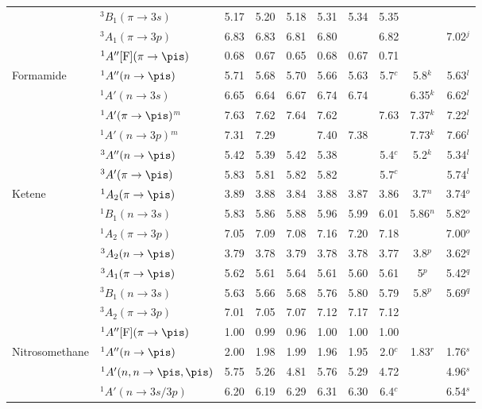 \begin{tabular}{ll|ccc|ccc|cc}
        &$^3B_1 (\pi \rightarrow 3s)$ 			&5.17&5.20&5.18&	5.31&5.34&5.35	&		   &			\\
        &$^3A_1 (\pi \rightarrow 3p)$			&6.83&6.83&6.81&	6.80&       &6.82	&		   &7.02$^j$	\\
        &$^1A'' [\mathrm{F}]	(\pi \rightarrow \pis)$	&0.68&0.67&0.65&	0.68&0.67&0.71	&	 	   &			\\
    Formamide	&$^1A'' (n \rightarrow \pis)$			&5.71&5.68&5.70	&5.66&5.63&5.7$^c$&5.8$^k$		&5.63$^l$	\\
        &$^1A' (n \rightarrow 3s)$				&6.65&6.64&6.67	&6.74&6.74&		&6.35$^k$	&6.62$^l$	\\	
        &$^1A' (\pi \rightarrow \pis)$$^m$		&7.63&7.62&7.64	&7.62&	&7.63	&7.37$^k$	&7.22$^l$	\\
        &$^1A' (n \rightarrow 3p)$$^m$			&7.31&7.29&		&7.40&7.38&		&7.73$^k$	&7.66$^l$	\\
        &$^3A'' (n \rightarrow \pis)$			&5.42&5.39&5.42	&5.38&	&5.4$^c$	&5.2$^k$		&5.34$^l$	\\
        &$^3A' (\pi \rightarrow \pis)$			&5.83&5.81&5.82	&5.82&	&5.7$^c$	&	&5.74$^l$	\\
    Ketene		&$^1A_2 (\pi \rightarrow \pis)$ 			&3.89&3.88&3.84&	3.88&3.87&3.86	&3.7$^n$	&3.74$^o$	\\
        &$^1B_1 (n \rightarrow 3s)$ 			&5.83&5.86&5.88&	5.96&5.99&6.01	&5.86$^n$&5.82$^o$	\\
        &$^1A_2 (\pi \rightarrow 3p)$ 			&7.05&7.09&7.08&	7.16&7.20&7.18	&		&7.00$^o$	\\
        &$^3A_2 (n \rightarrow \pis)$ 			&3.79&3.78&3.79&	3.78&3.78&3.77	&3.8$^p$	&3.62$^q$\\
        &$^3A_1 (\pi \rightarrow \pis)$ 			&5.62&5.61&5.64&	5.61&5.60&5.61	&5$^p$	&5.42$^q$\\
        &$^3B_1 (n \rightarrow 3s)$ 			&5.63&5.66&5.68&	5.76&5.80&5.79	&5.8$^p$	&5.69$^q$\\
        &$^3A_2 (\pi \rightarrow 3p)$ 			&7.01&7.05&7.07&	7.12&7.17&7.12	&		&		\\
        &$^1A''[\mathrm{F}]	(\pi \rightarrow \pis)$	&1.00&0.99&0.96&	1.00&1.00&1.00	&		&	\\
    Nitrosomethane&$^1A'' (n \rightarrow \pis)$			&2.00&1.98&1.99&	1.96&1.95&2.0$^c$	&1.83$^r$&1.76$^s$\\
        &$^1A' (n,n \rightarrow \pis,\pis)$		&5.75&5.26&4.81&	5.76&5.29	&4.72	&		&4.96$^s$\\
        &$^1A' (n \rightarrow 3s/3p)$ 			&6.20&6.19&6.29&	6.31&6.30&6.4$^c$	&		&6.54$^s$\\

\end{tabular}
